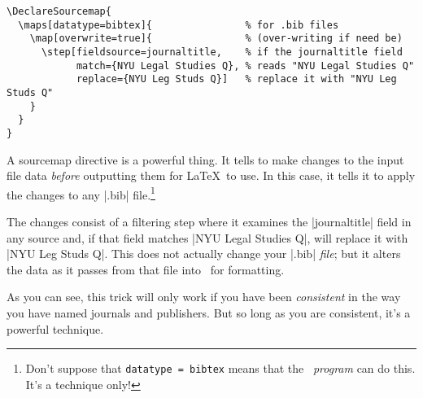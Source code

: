 \begin{Verbatim}
\DeclareSourcemap{
  \maps[datatype=bibtex]{                % for .bib files
    \map[overwrite=true]{                % (over-writing if need be)
      \step[fieldsource=journaltitle,    % if the journaltitle field
            match={NYU Legal Studies Q}, % reads "NYU Legal Studies Q"
            replace={NYU Leg Studs Q}]   % replace it with "NYU Leg Studs Q"
    }
  }
}
\end{Verbatim}

A sourcemap directive is a powerful thing. It tells  to make changes to the input
file data \emph{before} outputting them for \LaTeX\ to use. In this
case, it tells it to apply the changes to any |.bib|
file.\footnote{Don't suppose that \texttt{datatype = bibtex} means that
  the \bibtex\ \emph{program} can do this. It's a 
  technique only!}

 The changes consist of a filtering step where it examines the
|journaltitle| field in any source and, if that field matches\linebreak 
|NYU Legal Studies Q|,  will replace it with 
|NYU Leg Studs Q|. This does not actually change your 
|.bib| \emph{file}; but it alters the data as it passes from that file into
\biblatex\ for formatting.

As you can see, this trick will only work if you have been
\emph{consistent} in the way you have named journals and
publishers. But so long as you are consistent, it's a powerful
technique.


